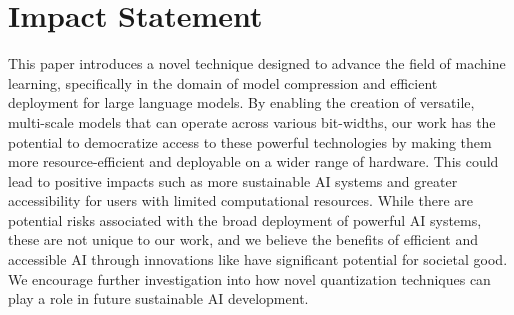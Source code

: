 \section*{Impact Statement}
This paper introduces a novel technique designed to advance the field of machine learning, specifically in the domain of model compression and efficient deployment for large language models. By enabling the creation of versatile, multi-scale models that can operate across various bit-widths, our work has the potential to democratize access to these powerful technologies by making them more resource-efficient and deployable on a wider range of hardware. This could lead to positive impacts such as more sustainable AI systems and greater accessibility for users with limited computational resources. While there are potential risks associated with the broad deployment of powerful AI systems, these are not unique to our work, and we believe the benefits of efficient and accessible AI through innovations like \alg have significant potential for societal good. We encourage further investigation into how novel quantization techniques can play a role in future sustainable AI development.